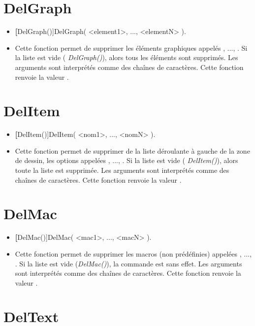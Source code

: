 \section{DelGraph}\label{cmdDelGraph}

\begin{itemize}
 \item \util \textbf[DelGraph()]{DelGraph( <element1>, ..., <elementN> )}.
 \item \desc Cette fonction permet de supprimer les éléments graphiques appelés , ..., . Si la liste est vide (\textsl{ DelGraph()}), alors tous les éléments sont supprimés. Les arguments sont interprétés comme des chaînes de caractères. Cette fonction renvoie la valeur \Nil.
\end{itemize}

\section{DelItem}\label{cmdDelItem}

\begin{itemize}
 \item \util \textbf[DelItem()]{DelItem( <nom1>, ..., <nomN> )}.
 \item \desc Cette fonction permet de supprimer de la liste déroulante à gauche de la zone de dessin, les options appelées , ..., . Si la liste est vide (\textsl{ DelItem()}), alors toute la liste est supprimée. Les arguments sont interprétés comme des chaînes de caractères. Cette fonction renvoie la valeur \Nil. 
\end{itemize}

\section{DelMac}\label{cmdDelMac}

\begin{itemize}
 \item \util \textbf[DelMac()]{DelMac( <mac1>, ..., <macN> )}.
 \item \desc Cette fonction permet de supprimer les macros (non prédéfinies) appelées , ..., . Si la liste est vide (\textsl{DelMac()}), la commande est sans effet. Les arguments sont interprétés comme des chaînes de caractères. Cette fonction renvoie la valeur \Nil.
\end{itemize}

\section{DelText}\label{cmdDelText}

